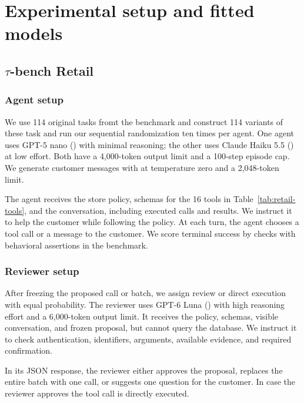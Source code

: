 \section{Experimental setup and fitted models}
\label{app:experimental-details}


\subsection{\texorpdfstring{$\tau$-bench}{tau-bench} Retail}
\label{app:retail-fit}

\subsubsection{Agent setup}
We use  114 original tasks fromt the benchmark and construct 114 variants of these task and run our sequential randomization ten times per
agent. One agent uses GPT-5 nano () with minimal
reasoning; the other uses Claude Haiku 5.5 () at low
effort. Both have a 4,000-token output limit and a
100-step episode cap. We generate customer messages with
 at temperature zero and a 2,048-token limit.

The agent receives the store policy, schemas for the 16 tools in
Table~\ref{tab:retail-tools}, and the conversation, including executed calls
and results. We instruct it to help the customer while following the policy.
At each turn, the agent chooses a tool call or a message to the customer. We
score terminal success by checks with behavioral
assertions in the benchmark.

\subsubsection{Reviewer setup}
After freezing the proposed call or batch, we assign review or direct execution
with equal probability. The reviewer uses GPT-6 Luna () with
high reasoning effort and a 6,000-token output limit. It receives the policy,
schemas, visible conversation, and frozen proposal, but cannot query the
database. We instruct it to check authentication, identifiers, arguments,
available evidence, and required confirmation.

In its JSON response, the reviewer either approves the proposal, replaces the
entire batch with one call, or suggests one question for the customer. In case the reviewer approves the tool call is directly executed. 

